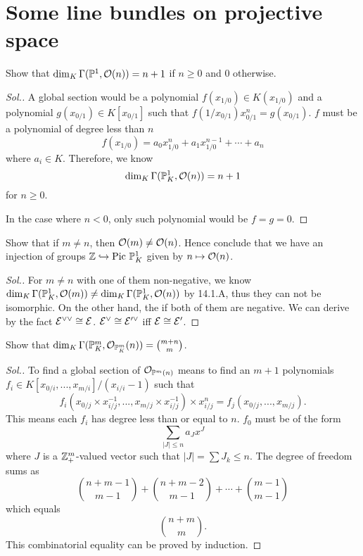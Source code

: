 \documentclass[11pt]{book} %
\begin{document}
\section{Some line bundles on projective space}
\begin{exr}
Show that $\dim_K \Gamma(\mathbb P^1,{\cal O}(n))=n+1$ if $n\geq 0$ and $0$ otherwise.
\end{exr}
\begin{proof}[Sol.]
A global section would be a polynomial  $f(x_{1/0})\in K(x_{1/0})$ and a polynomial $g(x_{0/1})\in K[x_{0/1}]$ such that $f(1/x_{0/1})x_{0/1}^n=g(x_{0/1})$. $f$ must be a polynomial of degree less than $n$
$$
f(x_{1/0})=a_{0}x_{1/0}^n+a_{1}x_{1/0}^{n-1}+\cdots+a_n
$$
where $a_i\in K$. Therefore, we know 
$$
\dim_K\Gamma(\mathbb P^1_K,{\cal O}(n))=n+1
$$
for $n\geq 0$.

In the case where $n<0$, only such polynomial would be $f=g=0$. 
\end{proof}
\begin{exr}
Show that if $m\neq n$, then ${\cal O}(m)\neq {\cal O}(n)$. Hence conclude that we have an injection of groups $\mathbb Z\hookrightarrow \text{Pic\ }\mathbb P^1_K$ given by $n\mapsto {\cal O}(n)$.
\end{exr}
\begin{proof}[Sol.]
For $m\neq n$ with one of them non-negative,  we know $\dim_K \Gamma(\mathbb P^1_K,{\cal O}(m))\neq \dim_K \Gamma(\mathbb P^1_K,{\cal O}(n))$ by 14.1.A, thus they can not be isomorphic. On the other hand, the if both of them are negative. We can derive by the fact ${\cal E}^{\vee\vee}\cong {\cal E}$. ${\cal E}^\vee\cong{\cal E}'^\vee$ iff ${\cal E}\cong {\cal E}'$.
\end{proof}
\begin{exr}
Show that $\dim_K\Gamma(\mathbb P^m_K,{\cal O}_{\mathbb P^m_K}(n))={m+n\choose m}$.
\end{exr}
\begin{proof}[Sol.]
To find a global section of ${\cal O}_{\mathbb P^m(n)}$ means to find an $m+1$ polynomials
$f_i\in K[x_{0/i},...,x_{m/i}]/(x_{i/i}-1)$ such that
$$
f_i(x_{0/j}\times x_{i/j}^{-1} ,...,x_{m/j}\times x_{i/j}^{-1} )\times x_{i/j}^{n}=f_j(x_{0/j},...,x_{m/j}).
$$
This means each $f_i$ has degree less than or equal to $n$. $f_0$ must be of the form
$$
\sum_{|J|\leq n} a_J x^J
$$
where $J$ is a $\mathbb Z_+^{m}$-valued vector such that $|J|=\sum J_k\leq n$. The degree of freedom sums as
$$
{n+m-1\choose m-1}+{n+m-2\choose m-1}+\cdots+{m-1\choose m-1}
$$
which equals
$$
{n+m\choose m}.
$$
This combinatorial equality can be proved by induction.
\end{proof}
\end{document}
